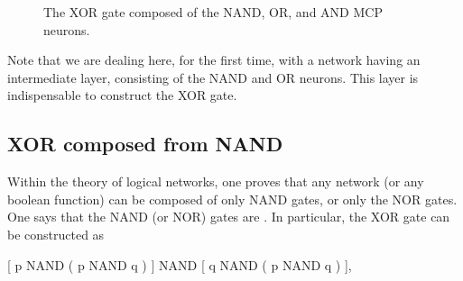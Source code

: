 \documentclass[a4paper,12pt,polish]{jupyterBook}
\let\sphinxpxdimen\pdfpxdimen\else\newdimen\sphinxpxdimen
\begin{document}
\begin{figure}[htbp]
\centering
\capstart

\noindent\sphinxincludegraphics[width=260\sphinxpxdimen]{{xor}.png}
\caption{The XOR gate composed of the NAND, OR, and AND MCP neurons.}\label{\detokenize{docs/mcp:xor-fig}}\end{figure}

\sphinxAtStartPar
Note that we are dealing here, for the first time, with a network having an intermediate layer, consisting of the NAND and OR neurons. This layer is indispensable to construct the XOR gate.


\subsection{XOR composed from NAND}
\label{\detokenize{docs/mcp:xor-composed-from-nand}}
\sphinxAtStartPar
Within the theory of logical networks, one proves that any network (or any boolean function) can be composed of only NAND gates, or only the NOR gates. One says that the NAND (or NOR) gates are . In particular, the XOR gate can be constructed as

\sphinxAtStartPar
{[} p NAND ( p NAND q ) {]} NAND {[} q NAND ( p NAND q ) {]},
\end{document}

